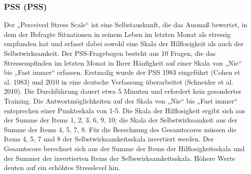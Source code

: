 \subsubsection{\acl{PSS} (\acs{PSS})}
\label{questionnaires:PSS}
Der „Perceived Stress Scale“ ist eine Selbstauskunft, die das Ausmaß bewertet, in dem der Befragte Situationen in seinem Leben im letzten Monat als stressig empfunden hat und erfasst dabei sowohl eine Skala der Hilflosigkeit als auch der Selbstwirksamkeit. Der PSS-Fragebogen besteht aus 10 Fragen, die das Stressempfinden im letzten Monat in Ihrer Häufigkeit auf einer Skala von „Nie“ bis „Fast immer“ erfassen. Erstmalig wurde der PSS 1983 eingeführt (Cohen et al. 1983) und 2010 in eine deutsche Verfassung überarbeitet (Schneider et al. 2010). 
Die Durchführung dauert etwa 5 Minuten und erfordert kein gesondertes Training. Die Antwortmöglichkeiten auf der Skala von „Nie“ bis „Fast immer“ entsprechen einer Punkteskala von 1-5. Die Skala der Hilflosigkeit ergibt sich aus der Summe der Items 1, 2, 3, 6, 9, 10; die Skala der Selbstwirksamkeit aus der Summe der Items 4, 5, 7, 8. Für die Berechnung des Gesamtscores müssen die Items 4, 5, 7 und 8 der Selbstwirksamkeitsskala invertiert werden. Der Gesamtscore berechnet sich aus der Summe der Items der Hilflosigkeitsskala und der Summer der invertierten Items der Selbswirksamkeitsskala. Höhere Werte deuten auf ein erhöhtes Stresslevel hin.

